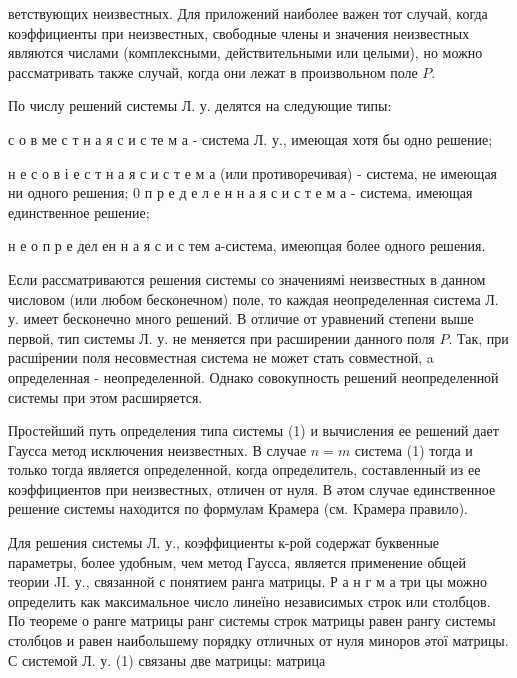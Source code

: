 \documentclass[10pt]{article}
\begin{document}
ветствующих неизвестных. Для приложений наиболее важен тот случай, когда коэффициенты при неизвестных, свободные члены и значения неизвестных являются числами (комплексными, действительными или целыми), но можно рассматривать также случай, когда они лежат в произвольном поле $P$.



По числу решений системы Л. у. делятся на следующие типы:



с о в ме с т н а я с и с те м а - система Л. у., имеющая хотя бы одно решение;



н е с о в і е с т н а я с и с т е м а (или противоречивая) - система, не имеющая ни одного решения; 0 п р е д е л е н н а я с и с т е м а - система, имеющая единственное решение;



н е о п р е дел ен н а я с и с тем а-система, имеюпцая более одного решения.



Если рассматриваются решения системы со значениямі неизвестных в данном числовом (или любом бесконечном) поле, то каждая неопределенная система Л. у. имеет бесконечно много решений. В отличие от уравнений степени выше первой, тип системы Л. у. не меняется при расширении данного поля $P$. Так, при расшірении поля несовместная система не может стать совместной, a определенная - неопределенной. Однако совокупность решений неопределенной системы при этом расширяется.



Простейший путь определения типа системы (1) и вычисления ее решений дает Гаусса метод исключения неизвестных. В случае $n=m$ система (1) тогда и только тогда является определенной, когда определитель, составленный из ее коэффициентов при неизвестных, отличен от нуля. В әтом случае единственное решение системы находится по формулам Крамера (см. Kрамера правило).



Для решения системы Л. у., коэффициенты к-рой содержат буквенные параметры, более удобным, чем метод Гаусса, является применение общей теории JI. у., связанной с понятием ранга матрицы. Р а н г м а три цы можно определить как максимальное число линеїно независимых строк или столбцов. По теореме о ранге матрицы ранг системы строк матрицы равен рангу системы столбцов и равен наибольшему порядку отличных от нуля миноров әтої матрицы. С системой Л. у. (1) связаны две матрицы: матрица
\end{document}
